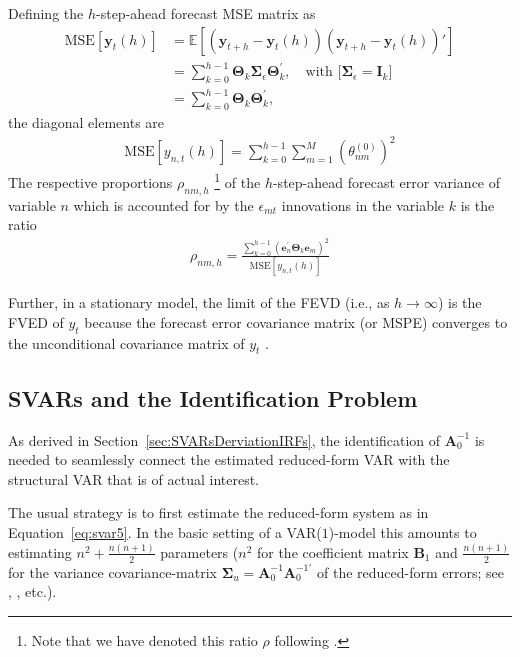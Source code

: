 \documentclass[a4paper,11pt,listof=nochaptergap,oneside,pointednumbers,bibtotoc,bigheadings,liststotoc,hidelinks]{scrbook}
\theoremstyle{mysatz}
\theoremstyle{mydefinition}
\theoremstyle{mytheorem}
\theoremstyle{mybemerkung}
\newcommand{\vect}[1]{\boldsymbol{\mathbf{#1}}}
\begin{document}
Defining the $h$-step-ahead forecast MSE matrix as
\begin{equation} \label{eq:FVED4}
\begin{split}
 		\text{MSE}[\vect{y}_t(h)] & = \mathbb{E}[(\vect{y}_{t+h} - \vect{y}_t(h))(\vect{y}_{t+h} - \vect{y}_t(h))'] \\
						     & = \sum\limits_{k=0}^{h-1} \vect{\Theta}_k\vect{\Sigma}_\epsilon\vect{\Theta}_k^', \quad \text{with [$\vect{\Sigma}_\epsilon = \vect{I}_k$]}\\
						     &= \sum\limits_{k=0}^{h-1} \vect{\Theta}_k\vect{\Theta}_k^',
\end{split}								
\end{equation}
the diagonal elements are
\begin{equation} \label{eq:FVED5}
\begin{split}
 		\text{MSE}[y_{n,t}(h)] = \sum\limits_{k=0}^{h-1}\sum\limits_{m=1}^{M}\left(\theta_{nm}^{(0)}\right)^2
\end{split}								
\end{equation}
The respective proportions $\rho_{nm,h}$ \footnote{Note that we have denoted this ratio $\rho$ following \citet{zivot:00}.} of the $h$-step-ahead forecast error variance of variable $n$ which is accounted for by the $\epsilon_{mt}$ innovations in the variable $k$ is the ratio
\begin{equation} \label{eq:FVED6}
\begin{split}
 		\rho_{nm,h} = \frac{\sum\limits_{k=0}^{h-1} (\vect{e}_n^'\vect{\Theta}_k\vect{e}_m)^2}{\text{MSE}[y_{n,t}(h)]}
\end{split}								
\end{equation}

Further, in a stationary model, the limit of the FEVD (i.e., as $h \rightarrow \infty$) is the FVED of $y_t$ because the forecast error covariance matrix (or MSPE) converges to the unconditional covariance matrix of $y_t$ \citep{lutkepohlkilian:17}.


\subsection{SVARs and the Identification Problem}
\label{sec:strcuturalVARsIdentification}
As derived in Section~\ref{sec:SVARsDerviationIRFs}, the identification of $\vect{A}_0^{-1}$ is needed to seamlessly connect the estimated reduced-form VAR with the structural VAR that is of actual interest. 

The usual strategy is to first estimate the reduced-form system as in Equation~\ref{eq:svar5}. In the basic setting of a VAR($1$)-model this amounts to estimating $n^2 + \frac{n(n+1)}{2}$ parameters ($n^2$ for the coefficient matrix $\vect{B}_1$ and $\frac{n(n+1)}{2}$ for the variance covariance-matrix $\vect{\Sigma}_u = \vect{A}_0^{-1}\vect{A}_0^{-1'}$ of the reduced-form errors; see \citet{lutkepohlkilian:17}, \citet{whelan:16}, etc.). 
\end{document}

